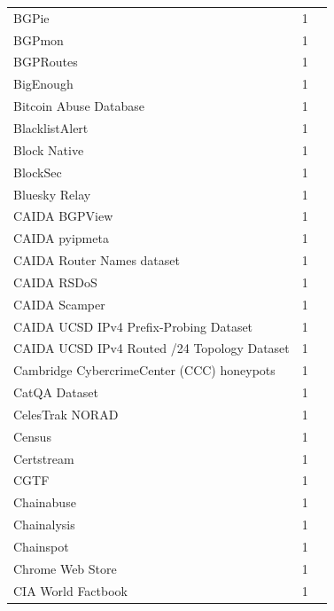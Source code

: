 \documentclass[11pt,a4paper]{article}
\begin{document}
\begin{longtable}{@{}p{} p{}p{}@{}}
BGPie & 1 & \cite{10.1007/978-3-030-72582-2_13} \\
BGPmon & 1 & \cite{10.1145/3487552.3487838} \\
BGPRoutes & 1 & \cite{10.1145/3777912.3839829} \\
BigEnough & 1 & \cite{10.1007/978-3-032-18268-5_13} \\
Bitcoin Abuse Database & 1 & \cite{10.1007/978-3-031-56252-5_3} \\
BlacklistAlert & 1 & \cite{10.1145/3777912.3839787} \\
Block Native & 1 & \cite{10.1145/3777912.3809150} \\
BlockSec & 1 & \cite{10.1145/3777912.3809150} \\
Bluesky Relay & 1 & \cite{10.1145/3646547.3688407} \\
CAIDA BGPView & 1 & \cite{10.1145/3618257.3624819} \\
CAIDA pyipmeta & 1 & \cite{10.1007/978-3-031-56249-5_8} \\
CAIDA Router Names dataset & 1 & \cite{10.1145/3487552.3487848} \\
CAIDA RSDoS & 1 & \cite{10.1145/3517745.3561458} \\
CAIDA Scamper & 1 & \cite{10.1007/978-3-031-85960-1_3} \\
CAIDA UCSD IPv4 Prefix-Probing Dataset & 1 & \cite{10.1145/3777912.3839834} \\
CAIDA UCSD IPv4 Routed /24 Topology Dataset & 1 & \cite{10.1145/3777912.3839834} \\
Cambridge CybercrimeCenter (CCC) honeypots & 1 & \cite{10.1145/3487552.3487835} \\
CatQA Dataset & 1 & \cite{10.1145/3777912.3839799} \\
CelesTrak NORAD & 1 & \cite{10.1145/3646547.3689024} \\
Census & 1 & \cite{10.1145/3646547.3688452} \\
Certstream & 1 & \cite{10.1145/3646547.3689021} \\
CGTF & 1 & \cite{10.1145/3777912.3839829} \\
Chainabuse & 1 & \cite{10.1145/3730567.3764476} \\
Chainalysis & 1 & \cite{10.1145/3646547.3689005} \\
Chainspot & 1 & \cite{10.1145/3777912.3839782} \\
Chrome Web Store & 1 & \cite{10.1145/3777912.3839816} \\
CIA World Factbook & 1 & \cite{10.1007/978-3-031-56252-5_11} \\

\end{longtable}
\end{document}
